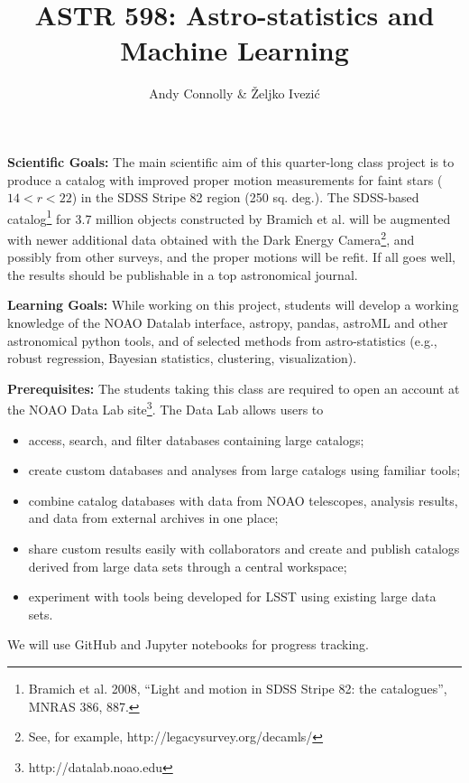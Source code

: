 \documentclass[10pt]{article}
\title{{\bf ASTR 598: Astro-statistics and Machine Learning}}
\author{Andy Connolly \& \v{Z}eljko Ivezi\'{c}}
\affil{University of Washington, Winter Quarter 2018}
\date{\vspace{-5ex}}
\begin{document}
\maketitle

\vskip 0.3in
\vskip 0.3in

{\bf Scientific Goals:}
The main scientific aim of this quarter-long class project is to produce a catalog
with improved proper motion measurements for faint stars ($14 < r < 22$) in the SDSS Stripe 
82 region (250 sq. deg.). The SDSS-based catalog\footnote{Bramich et al. 2008, ``Light and motion in SDSS 
Stripe 82: the catalogues'', MNRAS 386, 887.} for 3.7 million objects
constructed by Bramich et al. will be augmented with newer additional data obtained
with the Dark Energy Camera\footnote{See, for example, http://legacysurvey.org/decamls/}, 
and possibly from other surveys, and the proper motions will be refit. If all goes well,
the results should be publishable in a top astronomical journal. 

\vskip 0.2in
{\bf Learning Goals:}
While working on this project, students will develop a working knowledge of
the NOAO Datalab interface, astropy, pandas, astroML and other astronomical
python tools, and of selected methods from astro-statistics (e.g., robust
regression, Bayesian statistics, clustering, visualization). 

\vskip 0.2in
{\bf Prerequisites:}
The students taking this class are required to open an account at the NOAO Data Lab 
site\footnote{http://datalab.noao.edu}. The Data Lab allows users to
\begin{itemize}
\item access, search, and filter databases containing large catalogs;
\item create custom databases and analyses from large catalogs using familiar tools;
\item combine catalog databases with data from NOAO telescopes, analysis results, and data from external archives in one place; 
\item share custom results easily with collaborators and create and publish catalogs derived from large data sets through a central workspace;
\item experiment with tools being developed for LSST using existing large data sets.
\end{itemize}

We will use GitHub and Jupyter notebooks for progress tracking. 
\end{document}
